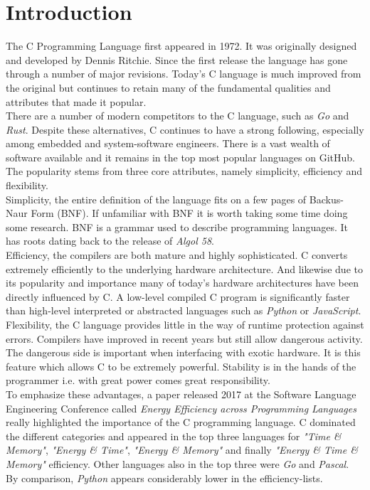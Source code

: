 \section{Introduction}

The C Programming Language first appeared in 1972. It was originally designed and developed by Dennis Ritchie. Since the first release the language has gone through a number of major revisions. Today's C language is much improved from the original but continues to retain many of the fundamental qualities and attributes that made it popular.\\ 

There are a number of modern competitors to the C language, such as \textit{Go} and \textit{Rust}. Despite these alternatives, C continues to have a strong following, especially among embedded and system-software engineers. There is a vast wealth of software available and it remains in the top most popular languages on GitHub. The popularity stems from three core attributes, namely simplicity, efficiency and flexibility.\\

Simplicity, the entire definition of the language fits on a few pages of Backus-Naur Form (BNF). If unfamiliar with BNF it is worth taking some time doing some research. BNF is a grammar used to describe programming languages. It has roots dating back to the release of \textit{Algol 58}.\\

Efficiency, the compilers are both mature and highly sophisticated. C converts extremely efficiently to the underlying hardware architecture. And likewise due to its popularity and importance many of today's hardware architectures have been directly influenced by C. A low-level compiled C program is significantly faster than high-level interpreted or abstracted languages such as \textit{Python} or \textit{JavaScript}.\\

Flexibility, the C language provides little in the way of runtime protection against errors. Compilers have improved in recent years but still allow dangerous activity. The dangerous side is important when interfacing with exotic hardware. It is this feature which allows C to be extremely powerful. Stability is in the hands of the programmer i.e. with great power comes great responsibility.\\

To emphasize these advantages, a paper released 2017 at the Software Language Engineering Conference called \textit{Energy Efficiency across Programming Languages} really highlighted the importance of the C programming language. C dominated the different categories and appeared in the top three languages for \textit{"Time \& Memory"}, \textit{"Energy \& Time"}, \textit{"Energy \& Memory"} and finally \textit{"Energy \& Time \& Memory"} efficiency. Other languages also in the top three were \textit{Go} and \textit{Pascal}. By comparison, \textit{Python} appears considerably lower in the efficiency-lists.\\


